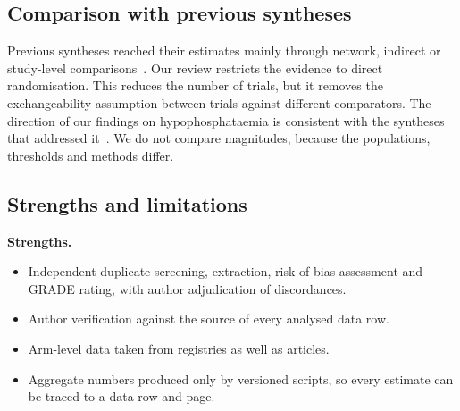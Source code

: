 \documentclass[11pt,a4paper]{article}
\begin{document}
\subsection{Comparison with previous syntheses}
Previous syntheses reached their estimates mainly through network, indirect or study-level comparisons~\cite{Bellos2020,Schaefer2021,Kennedy2023,Pollock2022,Divers2026,Azevedo2026}. Our review restricts the evidence to direct randomisation. This reduces the number of trials, but it removes the exchangeability assumption between trials against different comparators. The direction of our findings on hypophosphataemia is consistent with the syntheses that addressed it~\cite{Bellos2020,Schaefer2021,Azevedo2026}. We do not compare magnitudes, because the populations, thresholds and methods differ.

\subsection{Strengths and limitations}
\textbf{Strengths.}
\begin{itemize}
\item Independent duplicate screening, extraction, risk-of-bias assessment and GRADE rating, with author adjudication of discordances.
\item Author verification against the source of every analysed data row.
\item Arm-level data taken from registries as well as articles.
\item Aggregate numbers produced only by versioned scripts, so every estimate can be traced to a data row and page.
\end{itemize}
\end{document}
